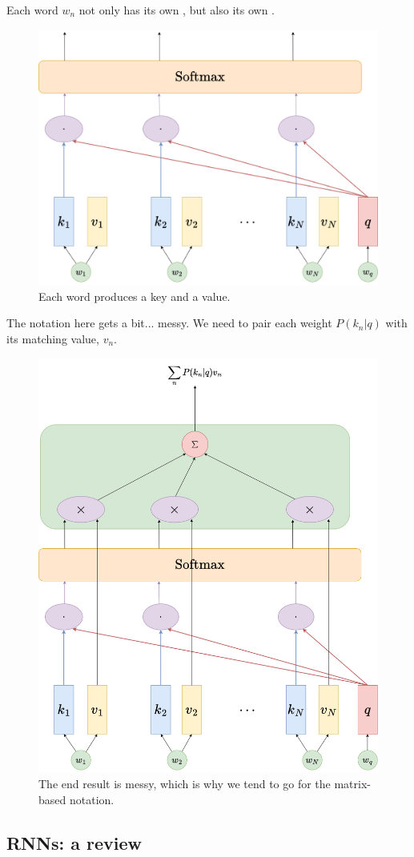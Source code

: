         Each word $w_n$ not only has its own , but also its own .

        \begin{figure}[H]
            \centering
            \includegraphics[width=0.45\linewidth]{images/transformers_images/softmax_value_vectors.png}
            \caption*{Each word produces a key and a value.}
        \end{figure}

        The notation here gets a bit... messy. We need to pair each weight $P(k_n|q)$ with its matching value, $v_n$.

        \begin{figure}[H]
            \centering
            \includegraphics[width=0.45\linewidth]{images/transformers_images/elementwise_attention.png}
            \caption*{The end result is messy, which is why we tend to go for the matrix-based notation.}
        \end{figure}

        


        


        





    \pagebreak
        
    \subsection{RNNs: a review}

